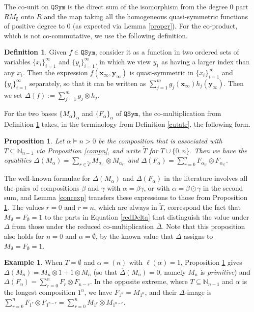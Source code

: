 \documentclass{article}
\newtheorem{prop}[thm]{Proposition}
\theoremstyle{definition}
\newtheorem{defn}[thm]{Definition}
\newtheorem{ex}[thm]{Example}
\begin{document}
The co-unit on $\mathtt{QSym}$ is the direct sum of the isomorphism from the degree 0 part $RM_{\emptyset}$ onto $R$ and the map taking all the homogeneous quasi-symmetric functions of positive degree to 0 (as expected via Lemma \ref{propgr}). For the co-product, which is not co-commutative, we use the following definition.
\begin{defn}
Given $f\in\mathtt{QSym}$, consider it as a function in two ordered sets of variables $\{x_{i}\}_{i=1}^{\infty}$ and $\{y_{i}\}_{i=1}^{\infty}$, in which we view $y_{1}$ as having a larger index than any $x_{i}$. Then the expression $f(\mathbf{x}_{\infty},\mathbf{y}_{\infty})$ is quasi-symmetric in $\{x_{i}\}_{i=1}^{\infty}$ and $\{y_{i}\}_{i=1}^{\infty}$ separately, so that it can be written as $\sum_{j=1}^{m}g_{j}(\mathbf{x}_{\infty})h_{j}(\mathbf{y}_{\infty})$. Then we set $\Delta(f):=\sum_{j=1}^{m}g_{j} \otimes h_{j}$. \label{DeltaQSym}
\end{defn}
For the two bases $\{M_{\alpha}\}_{\alpha}$ and $\{F_{\alpha}\}_{\alpha}$ of $\mathtt{QSym}$, the co-multiplication from Definition \ref{DeltaQSym} takes, in the terminology from Definition \ref{cutatr}, the following form.
\begin{prop}
Let $\alpha \vDash n>0$ be the composition that is associated with $T\subseteq\mathbb{N}_{n-1}$ via Proposition \ref{compn}, and write $\tilde{T}$ for $T\cup\{0,n\}$. Then we have the equalities $\Delta(M_{\alpha})=\sum_{r\in\tilde{T}}M_{\alpha_{|r}} \otimes M_{\alpha_{r|}}$ and $\Delta(F_{\alpha})=\sum_{r=0}^{n}F_{\alpha_{|r}} \otimes F_{\alpha_{r|}}$. \label{coprodQSym}
\end{prop}
The well-known formulae for $\Delta(M_{\alpha})$ and $\Delta(F_{\alpha})$ in the literature involves all the pairs of compositions $\beta$ and $\gamma$ with $\alpha=\beta\gamma$, or with $\alpha=\beta\odot\gamma$ in the second sum, and Lemma \ref{concexp} transfers these expressions to those from Proposition \ref{coprodQSym}. The values $r=0$ and $r=n$, which are always in $\tilde{T}$, correspond the fact that $M_{\emptyset}=F_{\emptyset}=1$ to the parts in Equation \eqref{redDelta} that distinguish the value under $\Delta$ from those under the reduced co-multiplication $\overline{\Delta}$. Note that this proposition also holds for $n=0$ and $\alpha=\emptyset$, by the known value that $\Delta$ assigns to $M_{\emptyset}=F_{\emptyset}=1$.

\begin{ex}
When $T=\emptyset$ and $\alpha=(n)$ with $\ell(\alpha)=1$, Proposition \ref{coprodQSym} gives $\Delta(M_{n})=M_{n}\otimes1+1 \otimes M_{n}$ (so that $\overline{\Delta}(M_{n})=0$, namely $M_{n}$ is \emph{primitive}) and $\Delta(F_{n})=\sum_{r=0}^{n}F_{r} \otimes F_{n-r}$. In the opposite extreme, where $T\subseteq\mathbb{N}_{n-1}$ and $\alpha$ is the longest composition $1^{n}$, we have $F_{1^{n}}=M_{1^{n}}$, and their $\Delta$-image is $\sum_{r=0}^{n}F_{1^{r}} \otimes F_{1^{n-r}}=\sum_{r=0}^{n}M_{1^{r}} \otimes M_{1^{n-r}}$. \label{coprodQSymext}
\end{ex}
\end{document}
